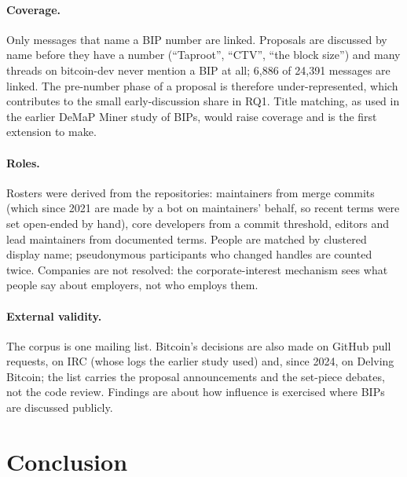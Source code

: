 \paragraph{Coverage.} Only messages that name a BIP number are linked. Proposals are discussed by name before they have a number (``Taproot'', ``CTV'', ``the block size'') and many threads on bitcoin-dev never mention a BIP at all; 6,886 of 24,391 messages are linked. The pre-number phase of a proposal is therefore under-represented, which contributes to the small early-discussion share in RQ1. Title matching, as used in the earlier DeMaP Miner study of BIPs, would raise coverage and is the first extension to make.

\paragraph{Roles.} Rosters were derived from the repositories: maintainers from merge commits (which since 2021 are made by a bot on maintainers' behalf, so recent terms were set open-ended by hand), core developers from a commit threshold, editors and lead maintainers from documented terms. People are matched by clustered display name; pseudonymous participants who changed handles are counted twice. Companies are not resolved: the corporate-interest mechanism sees what people say about employers, not who employs them.

\paragraph{External validity.} The corpus is one mailing list. Bitcoin's decisions are also made on GitHub pull requests, on IRC (whose logs the earlier study used) and, since 2024, on Delving Bitcoin; the list carries the proposal announcements and the set-piece debates, not the code review. Findings are about how influence is exercised where BIPs are discussed publicly.

\section{Conclusion}

